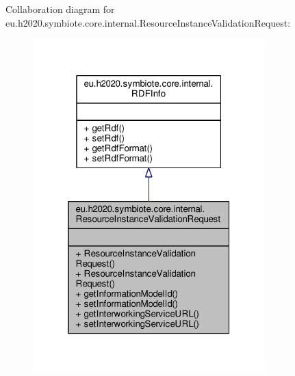 Collaboration diagram for eu.\+h2020.\+symbiote.\+core.\+internal.\+Resource\+Instance\+Validation\+Request\+:\nopagebreak
\begin{figure}[H]
\begin{center}
\leavevmode
\includegraphics[width=254pt]{classeu_1_1h2020_1_1symbiote_1_1core_1_1internal_1_1ResourceInstanceValidationRequest__coll__graph}
\end{center}
\end{figure}
